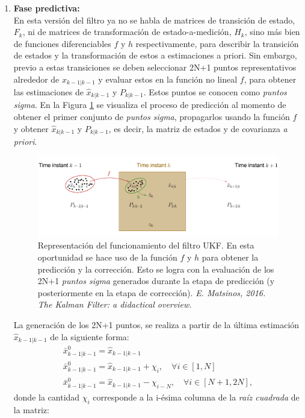 \begin{enumerate}
\item \textbf{Fase predictiva:}\\
En esta versi\'on del filtro \cite{ukf} ya no se habla de matrices de transici\'on de estado, $F_k$, ni de matrices de transformaci\'on de estado-a-medici\'on, $H_k$, sino m\'as bien de funciones diferenciables $f$ y $h$ respectivamente, para describir la transici\'on de estados  y la transformaci\'on de estos a estimaciones a priori. Sin embargo, previo a estas transiciones se deben seleccionar 2N+1 puntos representativos alrededor de $\hat{x}_{k-1|k-1}$ y evaluar estos en la funci\'on no lineal $f$, para obtener las estimaciones de $\hat{x}_{k|k-1}$ y $P_{k|k-1}$. Estos puntos se conocen como \textit{puntos sigma}. En la Figura \ref{fig:fukf} se visualiza el proceso de predicci\'on al momento de obtener el primer conjunto de \textit{puntos sigma}, propagarlos usando la funci\'on $f$ y obtener $\hat{x}_{k|k-1}$ y $P_{k|k-1}$, es decir, la matriz de estados y de covarianza \textit{a priori}. 

\begin{figure}[h!]
\includegraphics[scale=.5]{images/ukf}
\caption{Representaci\'on del funcionamiento del filtro UKF. En esta oportunidad se hace uso de la funci\'on $f$ y $h$ para obtener la predicci\'on y la correcci\'on. Esto se logra con la evaluaci\'on de los 2N+1 \textit{puntos sigma} generados durante la etapa de predicci\'on (y posteriormente en la etapa de correcci\'on). \textit{E. Matsinos, 2016. The Kalman Filter: a didactical overview.}}
\label{fig:fukf} 
\end{figure}

La generaci\'on de los 2N+1 puntos, se realiza a partir de la \'ultima estimaci\'on $\hat{x}_{k-1|k-1}$  de la siguiente forma:
\begin{equation}
\label{eq:eq18}
\begin{gathered}
\bar{x}_{k-1| k-1}^0 = \hat{x}_{k-1|k-1}\\
\bar{x}_{k-1| k-1}^0 = \hat{x}_{k-1|k-1}+ \chi_i, \quad  \forall i \in [1, N]\\
\bar{x}_{k-1| k-1}^0 = \hat{x}_{k-1|k-1}- \chi_{i-N}, \quad  \forall i \in [N+1, 2N],
\end{gathered}
\end{equation}
donde la cantidad $\chi_i$ corresponde a la i-\'esima columna de la \textit{ra\'iz cuadrada} de la matriz:


\end{enumerate}
